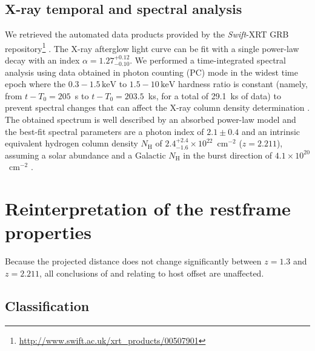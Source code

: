 \documentclass{aa}    %
\begin{document}
\subsection{X-ray temporal and spectral analysis}

We retrieved the automated data products provided by the \textit{Swift}-XRT GRB
repository\footnote{\url{http://www.swift.ac.uk/xrt\_products/00507901}}
\citep{Evans2009}. 
The X-ray afterglow light curve can be fit with a single power-law decay with an
index $\alpha=1.27_{-0.10}^{+0.12}$. We performed a time-integrated spectral
analysis using data obtained in photon counting (PC) mode in the widest time epoch where
the $0.3-1.5\,\mathrm{keV}$ to $1.5-10\,\mathrm{keV}$ hardness ratio is constant
(namely, from $t-T_0 = 205$~s to $t-T_0 = 203.5$~ks, for a total of 29.1~ks of
data) to prevent spectral changes that can affect the X-ray column density
determination \citep{Kopac2012}. 
The obtained spectrum is well described by an absorbed power-law
model and the best-fit spectral parameters are a photon index of $2.1 \pm 0.4$ and
an intrinsic equivalent hydrogen column density $N_{\mathrm{H}}$ of $2.4_{-1.6}^{+2.4}
\times 10^{22}$~cm$^{-2}$ ($z=2.211$), assuming a solar abundance and a Galactic $N_{\mathrm{H}}$ in
the burst direction of $4.1 \times 10^{20}$~cm$^{-2}$ \citep{Willingale2013}.

\section{Reinterpretation of the restframe properties}

Because the projected distance does not change significantly between $z = 1.3$ and $z =
2.211$, all conclusions of \citet{Margutti2012} and \citet{Sakamoto2013}
relating to host offset are unaffected.

\subsection{Classification} \label{classification}
\end{document}
